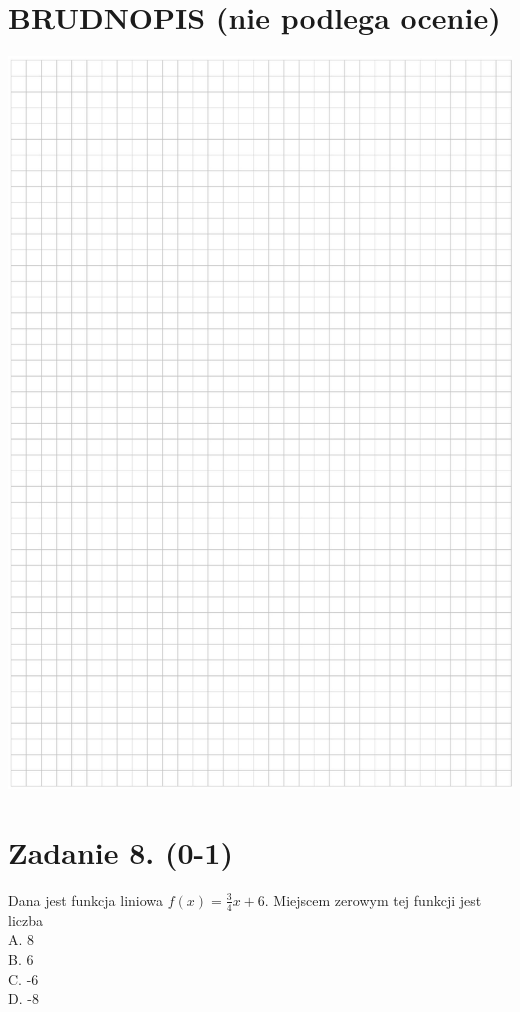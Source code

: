 \documentclass[10pt]{article}
\begin{document}
\section*{BRUDNOPIS (nie podlega ocenie)}
\begin{center}
\includegraphics[max width=\textwidth]{2024_11_21_1c92fcc0db78c9202015g-03}
\end{center}

\section*{Zadanie 8. (0-1)}
Dana jest funkcja liniowa \(f(x)=\frac{3}{4} x+6\). Miejscem zerowym tej funkcji jest liczba\\
A. 8\\
B. 6\\
C. -6\\
D. -8
\end{document}
